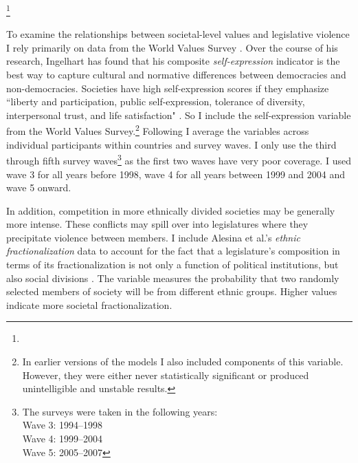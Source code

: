 \documentclass[a4paper]{article}\usepackage[]{graphicx}\usepackage[]{color}
\begin{document}
 \citeyearpar{Henisz2004}\footnote{}  \citep{Themner2014}

To examine the relationships between societal-level values and legislative violence I rely primarily on data from the World Values Survey \citeyearpar{WVS2009}. Over the course of his research, Ingelhart has found that his composite {\emph{self-expression}} indicator is the best way to capture cultural and normative differences between democracies and non-democracies. Societies have high self-expression scores if they emphasize ``liberty and participation, public self-expression, tolerance of diversity, interpersonal trust, and life satisfaction" \citep[64]{Inglehart2003}. So I include the self-expression variable from the World Values Survey.\footnote{In earlier versions of the models I also included components of this variable. However, they were either never statistically significant or produced unintelligible and unstable results.} Following \cite{Inglehart2003} I average the variables across individual participants within countries and survey waves. I only use the third through fifth survey waves\footnote{The surveys were taken in the following years: \\ Wave 3: 1994--1998 \\ Wave 4: 1999--2004 \\ Wave 5: 2005--2007} as the first two waves have very poor coverage. I used wave 3 for all years before 1998, wave 4 for all years between 1999 and 2004 and wave 5 onward.

In addition, competition in more ethnically divided societies may be generally more intense. These conflicts may spill over into legislatures where they precipitate violence between members. I include Alesina et al.'s \citeyearpar{Alesina2003} {\emph{ethnic fractionalization}} data to account for the fact that a legislature's composition in terms of its fractionalization is not only a function of political institutions, but also social divisions \citep{Neto1997, Mozaffar2003}. The variable measures the probability that two randomly selected members of society will be from different ethnic groups. Higher values indicate more societal fractionalization.
\end{document}
